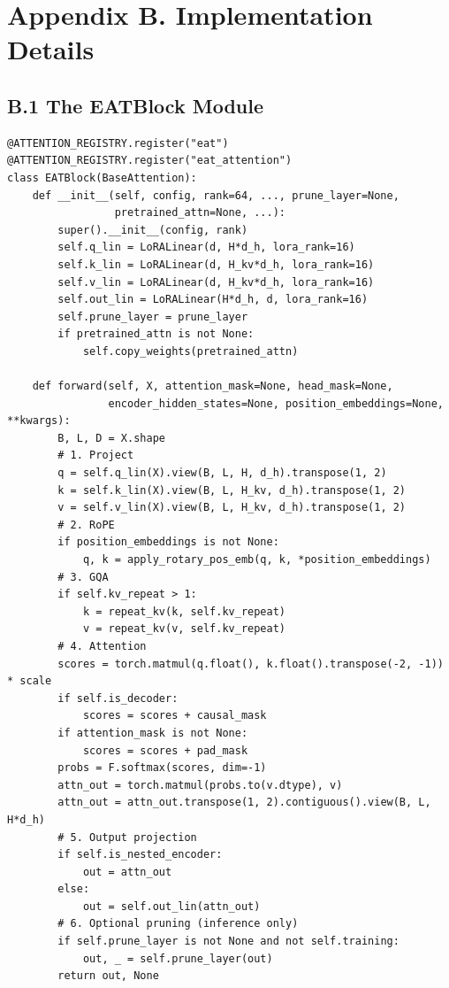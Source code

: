 
\section{Appendix B. Implementation Details}

\subsection{B.1 The EATBlock Module}

\begin{lstlisting}
@ATTENTION_REGISTRY.register("eat")
@ATTENTION_REGISTRY.register("eat_attention")
class EATBlock(BaseAttention):
    def __init__(self, config, rank=64, ..., prune_layer=None,
                 pretrained_attn=None, ...):
        super().__init__(config, rank)
        self.q_lin = LoRALinear(d, H*d_h, lora_rank=16)
        self.k_lin = LoRALinear(d, H_kv*d_h, lora_rank=16)
        self.v_lin = LoRALinear(d, H_kv*d_h, lora_rank=16)
        self.out_lin = LoRALinear(H*d_h, d, lora_rank=16)
        self.prune_layer = prune_layer
        if pretrained_attn is not None:
            self.copy_weights(pretrained_attn)
    
    def forward(self, X, attention_mask=None, head_mask=None,
                encoder_hidden_states=None, position_embeddings=None, **kwargs):
        B, L, D = X.shape
        # 1. Project
        q = self.q_lin(X).view(B, L, H, d_h).transpose(1, 2)
        k = self.k_lin(X).view(B, L, H_kv, d_h).transpose(1, 2)
        v = self.v_lin(X).view(B, L, H_kv, d_h).transpose(1, 2)
        # 2. RoPE
        if position_embeddings is not None:
            q, k = apply_rotary_pos_emb(q, k, *position_embeddings)
        # 3. GQA
        if self.kv_repeat > 1:
            k = repeat_kv(k, self.kv_repeat)
            v = repeat_kv(v, self.kv_repeat)
        # 4. Attention
        scores = torch.matmul(q.float(), k.float().transpose(-2, -1)) * scale
        if self.is_decoder:
            scores = scores + causal_mask
        if attention_mask is not None:
            scores = scores + pad_mask
        probs = F.softmax(scores, dim=-1)
        attn_out = torch.matmul(probs.to(v.dtype), v)
        attn_out = attn_out.transpose(1, 2).contiguous().view(B, L, H*d_h)
        # 5. Output projection
        if self.is_nested_encoder:
            out = attn_out
        else:
            out = self.out_lin(attn_out)
        # 6. Optional pruning (inference only)
        if self.prune_layer is not None and not self.training:
            out, _ = self.prune_layer(out)
        return out, None
\end{lstlisting}

